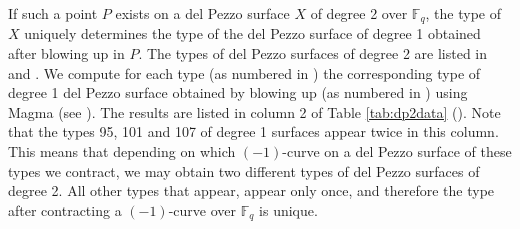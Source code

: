 \documentclass[a4paper, 11pt, reqno]{amsart}
\numberwithin{equation}{section} \numberwithin{figure}{section}
\def \F {{\mathbb F}}
\theoremstyle{definition}
\numberwithin{lemma}{section}
\begin{document}
If such a point $P$ exists on a del Pezzo surface $X$ of degree 2 over $\F_q$, the type of $X$ uniquely determines the type of the del Pezzo surface of degree 1 obtained after blowing up in $P$. The types of del Pezzo surfaces of degree 2 are listed in \cite[Table 2]{trepalin} and \cite[Table 1]{urabe2}. We compute for each type (as numbered in \cite{trepalin}) the corresponding type of degree 1 del Pezzo surface obtained by blowing up (as numbered in \cite[Table 2]{urabe2}) using Magma (see \cite{github_Existence_dP1}). The results are listed in column 2 of Table \ref{tab:dp2data} (). Note that the types 95, 101 and 107 of degree 1 surfaces appear twice in this column. This means that depending on which $(-1)$-curve on a del Pezzo surface of these types we contract, we may obtain two different types of del Pezzo surfaces of degree 2. All other types that appear, appear only once, and therefore the type after contracting a $(-1)$-curve over $\F_q$ is unique.
\end{document}
